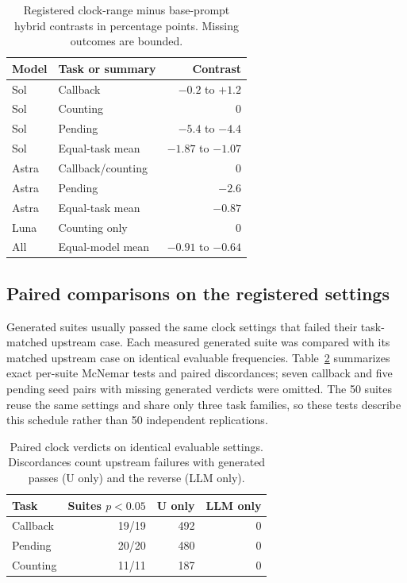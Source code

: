 \documentclass[sigconf,nonacm]{acmart}
\begin{document}
\begin{table}[t]
\caption{Registered clock-range minus base-prompt hybrid contrasts in percentage points. Missing outcomes are bounded.}
\label{tab:hybridcontrast}\scriptsize
\begin{tabular}{@{}llr@{}}\toprule
Model & Task or summary & Contrast \\ \midrule
Sol & Callback & $-0.2$ to $+1.2$ \\
Sol & Counting & 0 \\
Sol & Pending & $-5.4$ to $-4.4$ \\
Sol & Equal-task mean & $-1.87$ to $-1.07$ \\
Astra & Callback/counting & 0 \\
Astra & Pending & $-2.6$ \\
Astra & Equal-task mean & $-0.87$ \\
Luna & Counting only & 0 \\
All & Equal-model mean & $-0.91$ to $-0.64$ \\
\bottomrule\end{tabular}
\end{table}

\subsection{Paired comparisons on the registered settings}
Generated suites usually passed the same clock settings that failed their task-matched upstream case. Each measured generated suite was compared with its matched upstream case on identical evaluable frequencies. Table~\ref{tab:paired} summarizes exact per-suite McNemar tests and paired discordances; seven callback and five pending seed pairs with missing generated verdicts were omitted. The 50 suites reuse the same settings and share only three task families, so these tests describe this schedule rather than 50 independent replications.

\begin{table}[t]
\caption{Paired clock verdicts on identical evaluable settings. Discordances count upstream failures with generated passes (U only) and the reverse (LLM only).}
\label{tab:paired}\scriptsize
\begin{tabular}{@{}lrrr@{}}\toprule
Task & Suites $p<0.05$ & U only & LLM only \\ \midrule
Callback & 19/19 & 492 & 0 \\
Pending & 20/20 & 480 & 0 \\
Counting & 11/11 & 187 & 0 \\
\bottomrule\end{tabular}
\end{table}
\end{document}
